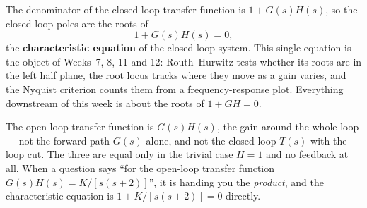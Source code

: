 \documentclass[11pt,a4paper]{article}
\begin{document}
\begin{keyidea}
The denominator of the closed-loop transfer function is $1+G(s)H(s)$, so the
closed-loop poles are the roots of
\[
  1 + G(s)H(s) = 0 ,
\]
the \textbf{characteristic equation} of the closed-loop system. This single
equation is the object of Weeks~7, 8, 11 and 12: Routh--Hurwitz tests whether
its roots are in the left half plane, the root locus tracks where they move as
a gain varies, and the Nyquist criterion counts them from a frequency-response
plot. Everything downstream of this week is about the roots of $1+GH=0$.
\end{keyidea}

\begin{pitfall}
The open-loop transfer function is $G(s)H(s)$, the gain around the whole loop
--- not the forward path $G(s)$ alone, and not the closed-loop $T(s)$ with the
loop cut. The three are equal only in the trivial case $H=1$ and no feedback at
all. When a question says ``for the open-loop transfer function
$G(s)H(s)=K/[s(s+2)]$'', it is handing you the \emph{product}, and the
characteristic equation is $1+K/[s(s+2)]=0$ directly.
\end{pitfall}
\end{document}
